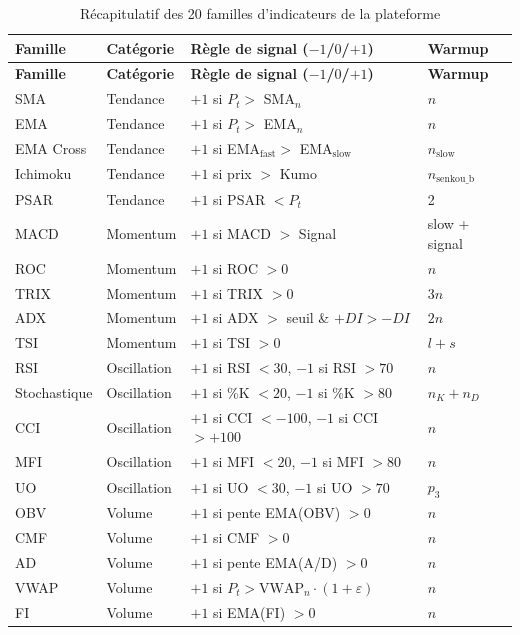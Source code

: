 \begin{longtable}{p{2.5cm} p{2cm} p{5cm} p{1.5cm}}
\caption{Récapitulatif des 20 familles d'indicateurs de la plateforme}
\label{tab:20_familles} \\
\toprule
\textbf{Famille} & \textbf{Catégorie} & \textbf{Règle de signal ($-1$/$0$/$+1$)} & \textbf{Warmup} \\
\midrule
\endfirsthead
\toprule
\textbf{Famille} & \textbf{Catégorie} & \textbf{Règle de signal ($-1$/$0$/$+1$)} & \textbf{Warmup} \\
\midrule
\endhead
\bottomrule
\endfoot

SMA              & Tendance  & $+1$ si $P_t >$ SMA$_n$                        & $n$ \\
EMA              & Tendance  & $+1$ si $P_t >$ EMA$_n$                        & $n$ \\
EMA Cross        & Tendance  & $+1$ si EMA$_{\text{fast}} >$ EMA$_{\text{slow}}$ & $n_{\text{slow}}$ \\
Ichimoku         & Tendance  & $+1$ si prix $>$ Kumo                          & $n_{\text{senkou\_b}}$ \\
PSAR             & Tendance  & $+1$ si PSAR $< P_t$                           & 2 \\
\midrule
MACD             & Momentum  & $+1$ si MACD $>$ Signal                        & slow + signal \\
ROC              & Momentum  & $+1$ si ROC $> 0$                              & $n$ \\
TRIX             & Momentum  & $+1$ si TRIX $> 0$                             & $3n$ \\
ADX              & Momentum  & $+1$ si ADX $>$ seuil \& $+DI > -DI$          & $2n$ \\
TSI              & Momentum  & $+1$ si TSI $> 0$                              & $l + s$ \\
\midrule
RSI              & Oscillation & $+1$ si RSI $< 30$, $-1$ si RSI $> 70$      & $n$ \\
Stochastique     & Oscillation & $+1$ si \%K $< 20$, $-1$ si \%K $> 80$     & $n_K + n_D$ \\
CCI              & Oscillation & $+1$ si CCI $< -100$, $-1$ si CCI $> +100$ & $n$ \\
MFI              & Oscillation & $+1$ si MFI $< 20$, $-1$ si MFI $> 80$     & $n$ \\
UO               & Oscillation & $+1$ si UO $< 30$, $-1$ si UO $> 70$       & $p_3$ \\
\midrule
OBV              & Volume    & $+1$ si pente EMA(OBV) $> 0$                  & $n$ \\
CMF              & Volume    & $+1$ si CMF $> 0$                              & $n$ \\
AD               & Volume    & $+1$ si pente EMA(A/D) $> 0$                  & $n$ \\
VWAP             & Volume    & $+1$ si $P_t > \text{VWAP}_n \cdot (1+\varepsilon)$ & $n$ \\
FI               & Volume    & $+1$ si EMA(FI) $> 0$                         & $n$ \\

\end{longtable}

